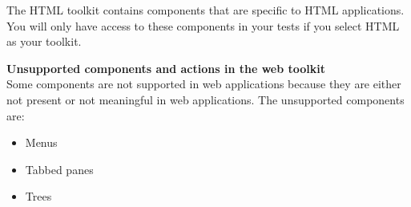 
The HTML toolkit contains components that are specific to HTML applications. You will only have access to these components in your tests if you select HTML as your \gdaut{} toolkit. 

\textbf{Unsupported components and actions in the web toolkit}\\
Some components are not supported in web applications because they are either not present or not meaningful in web applications. The unsupported components are:
\begin{itemize}
\item Menus
\item Tabbed panes
\item Trees
\end{itemize}
